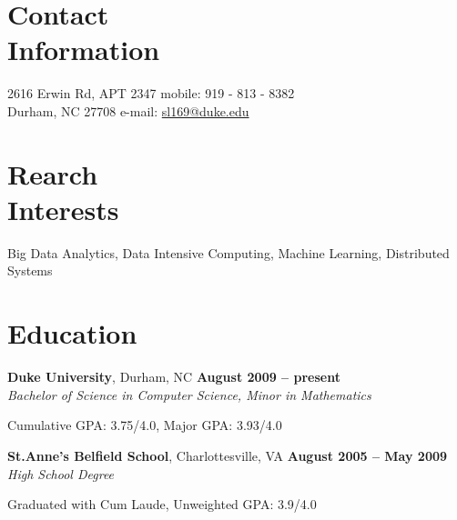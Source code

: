 \documentclass[10pt,margin,line]{cv}
\begin{document}
\begin{resume}

    \section{\mysidestyle Contact\\Information}
    2616 Erwin Rd, APT 2347                   \hfill mobile: 919 - 813 - 8382               \vspace{1mm}\\\vspace{0mm}%
    Durham, NC 27708          \hfill e-mail: \href{mailto:sl169@duke.edu}{sl169@duke.edu} \vspace{1mm}\\\vspace{-4.5mm}%
    \section{\mysidestyle Rearch\\Interests}
    Big Data Analytics, Data Intensive Computing, Machine Learning, Distributed Systems\vspace{1mm}

    \section{\mysidestyle Education}
    \textbf{Duke University}, Durham, NC \hfill \textbf{August 2009 -- present}\vspace{1mm}\\\vspace{0mm}%
    \textsl{Bachelor of Science in Computer Science, Minor in Mathematics}
    \vspace{-2mm}\\\vspace{-1mm}%
    \begin{list3}
        \item Cumulative GPA: 3.75/4.0, Major GPA: 3.93/4.0
  \end{list3}
  \textbf{St.Anne's Belfield School}, Charlottesville, VA \hfill \textbf{August 2005 -- May 2009}\vspace{1mm}\\\vspace{0mm}%
    \textsl{High School Degree}
    \vspace{-2mm}\\\vspace{-1mm}%
    \begin{list3}
        \item Graduated with Cum Laude, Unweighted GPA: 3.9/4.0
  \end{list3}


\end{resume}
\end{document}
